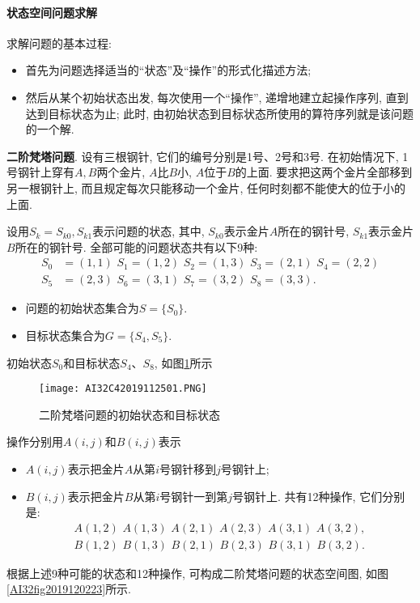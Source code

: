 \paragraph{状态空间问题求解}
求解问题的基本过程:
\begin{itemize}
\item 首先为问题选择适当的“状态”及“操作”的形式化描述方法;
\item 然后从某个初始状态出发, 每次使用一个“操作”, 递增地建立起操作序列, 直到达到目标状态为止; 此时, 由初始状态到目标状态所使用的算符序列就是该问题的一个解.
\end{itemize}
\begin{example}
  \textbf{二阶梵塔问题}. 设有三根钢针, 它们的编号分别是1号、2号和3号. 在初始情况下, 1号钢针上穿有$A,B$两个金片, $A$比$B$小, $A$位于$B$的上面. 要求把这两个金片全部移到另一根钢针上, 而且规定每次只能移动一个金片, 任何时刻都不能使大的位于小的上面.
\end{example}
\begin{result}
设用$S_k={S_{k0}, S_{k1}}$表示问题的状态, 其中, $S_{k0}$表示金片$A$所在的钢针号, $S_{k1}$表示金片$B$所在的钢针号.
全部可能的问题状态共有以下9种:
\begin{align}
S_0&=(1, 1)\,\,   S_1=(1, 2)\,\,     S_2=(1, 3)\,\,    S_3=(2, 1)\,\,    S_4=(2, 2)\\
S_5&=(2, 3)\,\,   S_6=(3, 1) \,\,    S_7=(3, 2) \,\,   S_8=(3, 3).
\end{align}

\begin{itemize}
\item 问题的初始状态集合为$S=\{S_0\}$.
\item 目标状态集合为$G=\{S_4, S_5\}$.
\end{itemize}
初始状态$S_0$和目标状态$S_4$、$S_8$, 如图\ref{AI32fig2019120222}所示
\begin{figure}[H]
\centering
\texttt{[image: AI32C42019112501.PNG]}
\caption{二阶梵塔问题的初始状态和目标状态}
\label{AI32fig2019120222}
\end{figure}
操作分别用$A(i, j)$和$B(i, j)$表示
\begin{itemize}
\item  $A(i, j)$表示把金片$A$从第$i$号钢针移到$j$号钢针上;
\item  $B(i, j)$表示把金片$B$从第$i$号钢针一到第$j$号钢针上. 共有12种操作, 它们分别是:
\begin{align*}
      A(1, 2)\,\,   A(1, 3) \,\,    A(2, 1)\,\,     A(2, 3) \,\,    A(3, 1) \,\,    A(3, 2),\\
      B(1, 2)\,\,     B(1, 3) \,\,     B(2, 1)\,\,     B(2, 3)  \,\,   B(3, 1)  \,\,    B(3, 2).
\end{align*}
\end{itemize}
根据上述9种可能的状态和12种操作, 可构成二阶梵塔问题的状态空间图, 如图\ref{AI32fig2019120223}所示.
\end{result}

